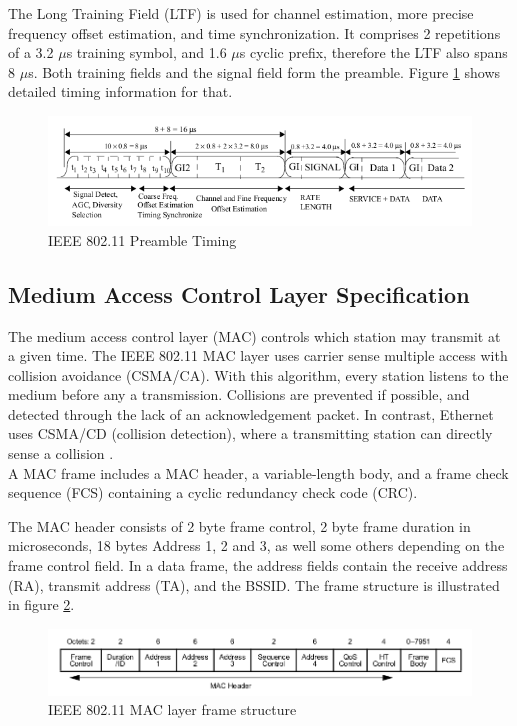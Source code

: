 The Long Training Field (LTF) is used for channel estimation, more precise frequency offset estimation, and time synchronization. It comprises 2 repetitions of a 3.2 $\mu$s training symbol, and 1.6 $\mu$s cyclic prefix, therefore the LTF also spans 8 $\mu$s. Both training fields and the signal field form the preamble. Figure \ref{fig:preamble} shows detailed timing information for that.

\begin{figure}[H]
	\centering
	\includegraphics[width=\textwidth]{gfx/images/preamble-format}
	\caption[IEEE 802.11 Preamble Timing]{IEEE 802.11 Preamble Timing \cite{ieee2012}}
	\label{fig:preamble}
\end{figure}


\subsection{Medium Access Control Layer Specification} \label{sec:mac-format}

The medium access control layer (MAC) controls which station may transmit at a given time. The IEEE 802.11 MAC layer uses carrier sense multiple access with collision avoidance (CSMA/CA). With this algorithm, every station listens to the medium before any a transmission. Collisions are prevented if possible, and detected through the lack of an acknowledgement packet. In contrast, Ethernet uses CSMA/CD (collision detection), where a transmitting station can directly sense a collision \cite{NEEDED}.\\

A MAC frame includes a MAC header, a variable-length body, and a frame check sequence (FCS) containing a cyclic redundancy check code (CRC).

The MAC header consists of 2 byte frame control, 2 byte frame duration in microseconds, 18 bytes Address 1, 2 and 3, as well some others depending on the frame control field. In a data frame, the address fields contain the receive address (RA), transmit address (TA), and the BSSID. The frame structure is illustrated in figure \ref{fig:mac-format}.

\begin{figure}[H]
	\centering
	\includegraphics[width=\textwidth]{gfx/images/mac-format}
	\caption[IEEE 802.11 MAC layer frame structure]{IEEE 802.11 MAC layer frame structure \cite{ieee2012}}
	\label{fig:mac-format}
\end{figure}


